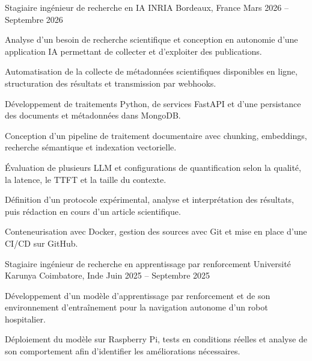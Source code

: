 
\begin{cventries}
  \cventry
    {Stagiaire ingénieur de recherche en IA}
    {INRIA}
    {Bordeaux, France}
    {Mars 2026 -- Septembre 2026}
    {
      \begin{cvitems}
        \item {Analyse d’un besoin de recherche scientifique et conception en autonomie d’une application IA permettant de collecter et d’exploiter des publications.}
        \item {Automatisation de la collecte de métadonnées scientifiques disponibles en ligne, structuration des résultats et transmission par webhooks.}
        \item {Développement de traitements Python, de services FastAPI et d’une persistance des documents et métadonnées dans MongoDB.}
        \item {Conception d’un pipeline de traitement documentaire avec chunking, embeddings, recherche sémantique et indexation vectorielle.}
        \item {Évaluation de plusieurs LLM et configurations de quantification selon la qualité, la latence, le TTFT et la taille du contexte.}
        \item {Définition d’un protocole expérimental, analyse et interprétation des résultats, puis rédaction en cours d’un article scientifique.}
        \item {Conteneurisation avec Docker, gestion des sources avec Git et mise en place d’une CI/CD sur GitHub.}
      \end{cvitems}
    }

  \cventry
    {Stagiaire ingénieur de recherche en apprentissage par renforcement}
    {Université Karunya}
    {Coimbatore, Inde}
    {Juin 2025 -- Septembre 2025}
    {
      \begin{cvitems}
        \item {Développement d’un modèle d’apprentissage par renforcement et de son environnement d’entraînement pour la navigation autonome d’un robot hospitalier.}
        \item {Déploiement du modèle sur Raspberry Pi, tests en conditions réelles et analyse de son comportement afin d’identifier les améliorations nécessaires.}
      \end{cvitems}
    }
\end{cventries}
